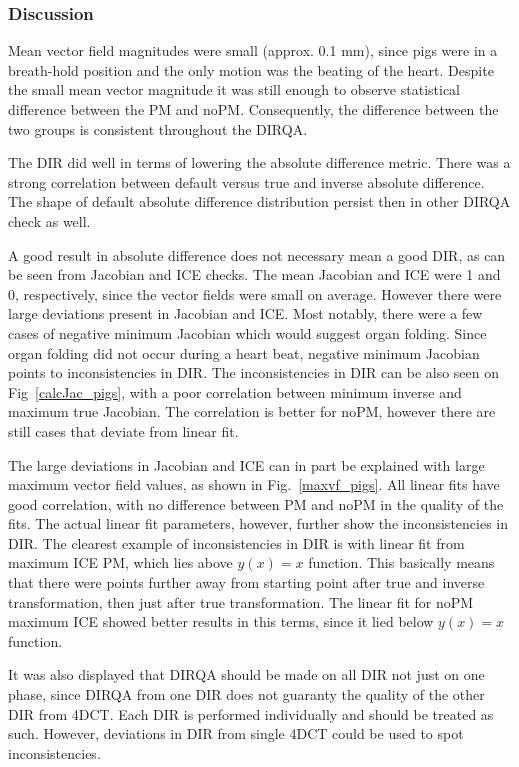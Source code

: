 \documentclass[type=dr, dr=rernat, accentcolor=tud7b,colorbacktitle, bigchapter, openright, twoside, 12pt ]{tudthesis}
\begin{document}
\subsubsection{Discussion}

Mean vector field magnitudes were small (approx. 0.1 mm), since pigs were in a breath-hold position and the only motion was the beating of the heart. 
Despite the small mean vector magnitude it was still enough to observe statistical difference between the PM and noPM.
Consequently, the difference between the two groups is consistent throughout the DIRQA.

The DIR did well in terms of lowering the absolute difference metric. There was a strong correlation between default versus true and inverse absolute difference. The shape of default absolute difference
distribution persist then in other DIRQA check as well.

A good result in absolute difference does not necessary mean a good DIR, as can be seen from Jacobian and ICE checks. The mean Jacobian and ICE were 1 and 0, respectively, since the
vector fields were small on average. However there were large deviations present in Jacobian and ICE. Most notably, there were a few cases of negative minimum Jacobian which would suggest 
organ folding. Since organ folding did not occur during a heart beat, negative minimum Jacobian points to inconsistencies in DIR. The inconsistencies in DIR can be also seen on Fig~\ref{calcJac_pigs},
with a poor correlation between minimum inverse and maximum true Jacobian. The correlation is better for noPM, however there are still cases that deviate from linear fit.

The large deviations in Jacobian and ICE can in part be explained with large maximum vector field values, as shown in Fig.~\ref{maxvf_pigs}. All linear fits have good correlation, with no
difference between PM and noPM in the quality of the fits. The actual linear fit parameters, however, further show the inconsistencies in DIR. The clearest example of inconsistencies in
DIR is with linear fit from maximum ICE PM, which lies above $y(x)=x$ function. This basically means that there were points further away from starting point after true and inverse transformation, 
then just after true transformation. The linear fit for noPM maximum ICE showed better results in this terms, since it lied below $y(x)=x$ function.

It was also displayed that DIRQA should be made on all DIR not just on one phase, since DIRQA from one DIR does not guaranty the quality of the other DIR from 4DCT. Each DIR is performed individually and should be treated as such. However, deviations in DIR from single 4DCT could be used to
spot inconsistencies.
\end{document}
